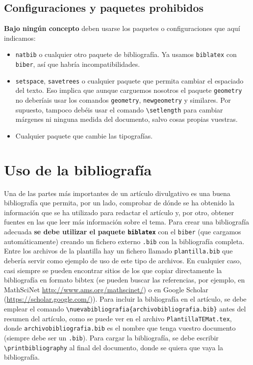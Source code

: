 \documentclass[%
extracommands,%
]{revistaanem}
\begin{document}
\subsection{Configuraciones y paquetes prohibidos}
\textbf{Bajo ningún concepto} deben usarse los paquetes o configuraciones que aquí indicamos:
\begin{itemize}
\item \verb+natbib+ o cualquier otro paquete de bibliografía.
  Ya usamos \verb+biblatex+ con \verb+biber+, así que habría incompatibilidades.
\item \verb+setspace+, \verb+savetrees+ o cualquier paquete que permita cambiar el espaciado del texto.
  Eso implica que aunque carguemos nosotros el paquete \verb+geometry+ no deberíais usar los comandos \verb+geometry+, \verb+newgeometry+ y similares.
  Por supuesto, tampoco debéis usar el comando \verb+\setlength+ para cambiar márgenes ni ninguna medida del documento, salvo cosas propias vuestras.
\item Cualquier paquete que cambie las tipografías.
\end{itemize}

\section{Uso de la bibliografía}

Una de las partes más importantes de un artículo divulgativo es una buena bibliografía que permita, por un lado, comprobar de dónde se ha obtenido la información que se ha utilizado para redactar el artículo y, por otro, obtener fuentes en las que leer más información sobre el tema.
Para crear una bibliografía adecuada \textbf{se debe utilizar el paquete \texttt{biblatex}} con el  \verb+biber+ (que cargamos automáticamente) creando un fichero externo \verb+.bib+ con la bibliografía completa.
Entre los archivos de la plantilla hay un fichero llamado \verb+plantilla.bib+ que debería servir como ejemplo de uso de este tipo de archivos.
En cualquier caso, casi siempre se pueden encontrar sitios de los que copiar directamente la bibliografía en formato bibtex (se pueden buscar las referencias, por ejemplo, en MathSciNet \url{http://www.ams.org/mathscinet/}) o en Google Scholar (\url{https://scholar.google.com/})).
Para incluir la bibliografía en el artículo, se debe emplear el comando \verb+\nuevabibliografia{archivobibliografia.bib}+ antes del resumen del artículo, como se puede ver en el archivo \verb+PlantillaTEMat.tex+, donde \verb+archivobibliografia.bib+ es el nombre que tenga vuestro documento (siempre debe ser un \verb+.bib+).
Para cargar la bibliografía, se debe escribir \verb+\printbibliography+ al final del documento, donde se quiera que vaya la bibliografía.
\end{document}
